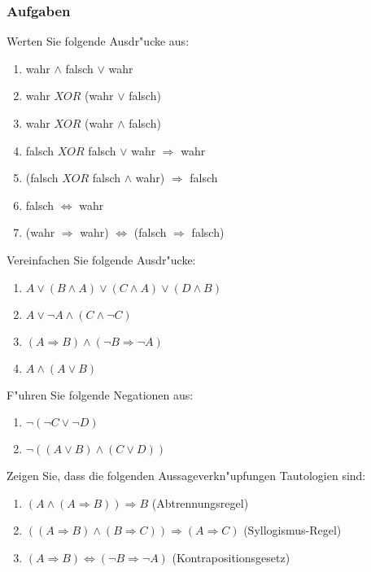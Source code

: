 \subsubsection{Aufgaben}
Werten Sie folgende Ausdr"ucke aus:
\begin{enumerate}
	\item wahr $\land$ falsch $\lor$ wahr
	\item wahr $XOR$ (wahr $\lor$ falsch)
	\item wahr $XOR$ (wahr $\land$ falsch)
	\item falsch $XOR$ falsch $\lor$ wahr $\Rightarrow$ wahr
	\item (falsch $XOR$ falsch $\land$ wahr) $\Rightarrow$ falsch
	\item falsch $\iff$ wahr
	\item (wahr $\Rightarrow$ wahr) $\iff$ (falsch $\Rightarrow$ falsch)
\end{enumerate}
Vereinfachen Sie folgende Ausdr"ucke:
\begin{enumerate}
	\item $A \lor (B \land A) \lor (C \land A) \lor (D \land B)$
	\item $A \lor \neg A \land (C \land \neg C)$
	\item $(A \Rightarrow B) \land (\neg B \Rightarrow \neg A)$
	\item $A \land (A \lor B)$
\end{enumerate}
F"uhren Sie folgende Negationen aus:
\begin{enumerate}
	\item $\neg (\neg C \lor \neg D)$
	\item $\neg ((A \lor B) \land (C \lor D))$
\end{enumerate}
Zeigen Sie, dass die folgenden Aussageverkn"upfungen Tautologien sind:
\begin{enumerate}
	\item $(A \land (A \Rightarrow B)) \Rightarrow B$ (Abtrennungsregel)
	\item $((A \Rightarrow B) \land (B \Rightarrow C)) \Rightarrow (A \Rightarrow C)$ (Syllogismus-Regel)
	\item $(A \Rightarrow B) \iff (\neg B \Rightarrow \neg A)$ (Kontrapositionsgesetz)
\end{enumerate}



